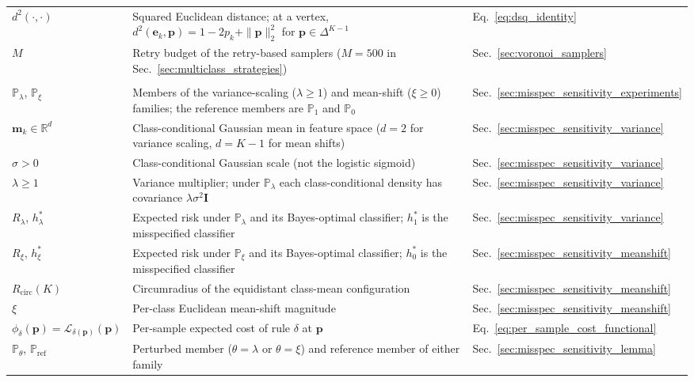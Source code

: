 {\begin{longtable}{@{}l >{\raggedright\arraybackslash}p{8cm} l@{}}
$d^2(\cdot, \cdot)$ & Squared Euclidean distance; at a vertex, $d^2(\mathbf{e}_k, \mathbf{p}) = 1 - 2p_k + \|\mathbf{p}\|_2^2$ for $\mathbf{p} \in \Delta^{K-1}$ & Eq.~\eqref{eq:dsq_identity} \\
$M$ & Retry budget of the retry-based samplers ($M = 500$ in Sec.~\ref{sec:multiclass_strategies}) & Sec.~\ref{sec:voronoi_samplers} \\
\addlinespace
\multicolumn{3}{@{}l}{\textit{Misspecification-sensitivity analysis (Chapter~\ref{sec:misspec_sensitivity_K})}}\\
\midrule
$\mathbb{P}_\lambda$, $\mathbb{P}_\xi$ & Members of the variance-scaling ($\lambda \geq 1$) and mean-shift ($\xi \geq 0$) families; the reference members are $\mathbb{P}_1$ and $\mathbb{P}_0$ & Sec.~\ref{sec:misspec_sensitivity_experiments} \\
$\mathbf{m}_k \in \mathbb{R}^d$ & Class-conditional Gaussian mean in feature space ($d = 2$ for variance scaling, $d = K{-}1$ for mean shifts) & Sec.~\ref{sec:misspec_sensitivity_variance} \\
$\sigma > 0$ & Class-conditional Gaussian scale (not the logistic sigmoid) & Sec.~\ref{sec:misspec_sensitivity_variance} \\
$\lambda \geq 1$ & Variance multiplier; under $\mathbb{P}_\lambda$ each class-conditional density has covariance $\lambda\sigma^2\mathbf{I}$ & Sec.~\ref{sec:misspec_sensitivity_variance} \\
$R_\lambda$, $h^*_\lambda$ & Expected risk under $\mathbb{P}_\lambda$ and its Bayes-optimal classifier; $h^*_1$ is the misspecified classifier & Sec.~\ref{sec:misspec_sensitivity_variance} \\
$R_\xi$, $h^*_\xi$ & Expected risk under $\mathbb{P}_\xi$ and its Bayes-optimal classifier; $h^*_0$ is the misspecified classifier & Sec.~\ref{sec:misspec_sensitivity_meanshift} \\
$R_{\mathrm{circ}}(K)$ & Circumradius of the equidistant class-mean configuration & Sec.~\ref{sec:misspec_sensitivity_meanshift} \\
$\xi$ & Per-class Euclidean mean-shift magnitude & Sec.~\ref{sec:misspec_sensitivity_meanshift} \\
$\phi_\delta(\mathbf{p}) = \mathcal{L}_{\delta(\mathbf{p})}(\mathbf{p})$ & Per-sample expected cost of rule $\delta$ at $\mathbf{p}$ & Eq.~\eqref{eq:per_sample_cost_functional} \\
$\mathbb{P}_\theta$, $\mathbb{P}_{\mathrm{ref}}$ & Perturbed member ($\theta = \lambda$ or $\theta = \xi$) and reference member of either family & Sec.~\ref{sec:misspec_sensitivity_lemma} \\

\end{longtable}}
